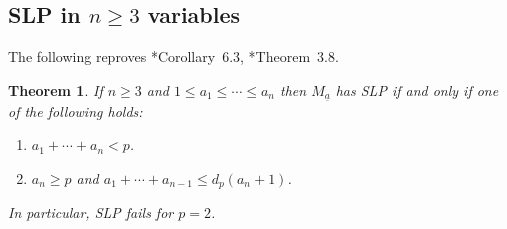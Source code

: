 \documentclass[11pt,reqno]{amsart}
\newcommand{\ul}[1]{\underline{#1}}
\newtheorem{theorem}{Theorem}[section]
\theoremstyle{definition}
\theoremstyle{remark}
\numberwithin{equation}{section}
\begin{document}
\subsection{SLP in $n\geq 3$ variables}
\label{subsec:SLP-manyvars}
The following reproves \cite{Cook12}*{Corollary~6.3}, \cite{lund-nick}*{Theorem~3.8}.

\begin{theorem}\label{thm:SLP-manyvars}
    If $n\geq 3$ and $1\leq a_1\leq\cdots\leq a_n$ then $M_{\ul{a}}$ has SLP if and only if one of the following holds:
    \begin{enumerate}
        \item $a_1+\cdots+a_n<p$.
        \item $a_n\geq p$ and $a_1+\cdots+a_{n-1}\leq d_p(a_n+1)$.
    \end{enumerate}
    In particular, SLP fails for $p=2$.
\end{theorem}
\end{document}
